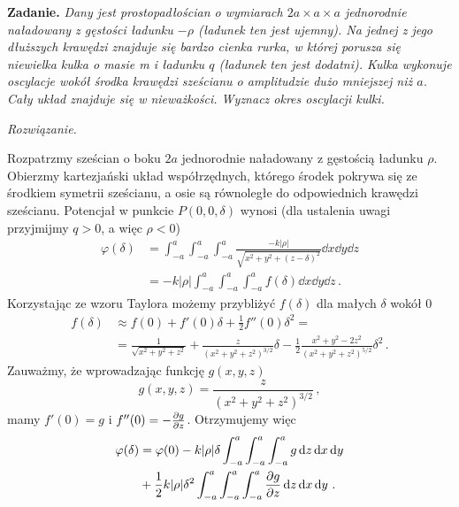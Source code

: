 \documentclass[../main.tex]{subfiles}
\begin{document}
\textbf{Zadanie.} \textit{Dany jest prostopadłościan o wymiarach \(2a \times a \times a\) jednorodnie naładowany z gęstości ładunku \(-\rho\) (ładunek ten jest ujemny). Na jednej z jego dłuższych krawędzi znajduje się bardzo cienka rurka, w której porusza się niewielka kulka o masie m i ładunku \(q\) (ładunek ten jest dodatni). Kulka wykonuje oscylacje wokół środka krawędzi sześcianu o amplitudzie dużo mniejszej niż \(a\). Cały układ znajduje się w nieważkości. Wyznacz okres oscylacji kulki.}
\medskip

\textit{Rozwiązanie.}
\medskip

Rozpatrzmy sześcian o boku \(2a\) jednorodnie naładowany z gęstością ładunku \(\rho\). Obierzmy kartezjański układ współrzędnych, którego środek pokrywa się ze środkiem symetrii sześcianu, a osie są równoległe do odpowiednich krawędzi sześcianu. Potencjał w punkcie \(P(0,0,\delta)\) wynosi (dla ustalenia uwagi przyjmijmy \(q>0\), a więc \(\rho<0\))
\begin{equation*}
\begin{split}
    \varphi(\delta)&=\int_{-a}^a\int_{-a}^a\int_{-a}^a\frac{-k|\rho|}{\sqrt{x^2+y^2+(z-\delta)^2}}\dd{x}\dd{y}\dd{z}\\
    &=-k|\rho| \int_{-a}^a\int_{-a}^a\int_{-a}^a f(\delta)\dd{x}\dd{y}\dd{z}\,.
\end{split}
\end{equation*}
Korzystając ze wzoru Taylora możemy przybliżyć \(f(\delta)\) dla małych \(\delta\) wokół 0
\begin{equation*}
\begin{split}
    f(\delta)&\approx f(0)+f'(0)\delta+\frac{1}{2}f''(0)\delta^2=\\
    &=\frac{1}{\sqrt{x^2+y^2+z^2}}+\frac{z}{(x^2+y^2+z^2)^{3/2}}\delta-\frac{1}{2}\frac{x^2+y^2-2z^2}{(x^2+y^2+z^2)^{5/2}}\delta^2\,.
\end{split}
\end{equation*}
Zauważmy, że wprowadzając funkcję \(g(x,y,z)\) 
\begin{equation*}
    g(x,y,z)=\frac{z}{(x^2+y^2+z^2)^{3/2}}\,,
\end{equation*}
mamy \(f'(0)=g\) i \(f''(0)=-\pdv{g}{z}\). Otrzymujemy więc
\begin{equation*}
\begin{split}
    \varphi(\delta)&=\varphi(0)-k|\rho|\delta \int_{-a}^a\int_{-a}^a\int_{-a}^ag \dd{z}\dd{x}\dd{y}\\
    &+\frac{1}{2}k|\rho|\delta^2\int_{-a}^a\int_{-a}^a\int_{-a}^a\pdv{g}{z}\dd{z}\dd{x}\dd{y}\,.
\end{split}
\end{equation*}
\end{document}
